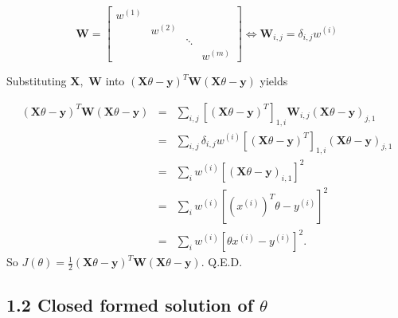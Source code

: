 \documentclass[english,11pt]{article}
\begin{document}
 
\begin{equation}
\boldsymbol{W}=\left[\begin{array}{cccc}
w^{(1)}\\
 & w^{(2)}\\
 &  & \ddots\\
 &  &  & w^{(m)}
\end{array}\right]\Longleftrightarrow\boldsymbol{W}_{i,j}=\delta_{i,j}w^{(i)}    
\end{equation}


Substituting $\boldsymbol{X},$ $\boldsymbol{W}$ into $(\boldsymbol{X}\theta-\boldsymbol{y})^{T}\boldsymbol{W}(\boldsymbol{X}\theta-\boldsymbol{y})$
yields

\begin{eqnarray*}
(\boldsymbol{X}\theta-\boldsymbol{y})^{T}\boldsymbol{W}(\boldsymbol{X}\theta-\boldsymbol{y}) & = & \sum_{i,j}\left[(\boldsymbol{X}\theta-\boldsymbol{y})^{T}\right]_{1,i}\boldsymbol{W}_{i,j}(\boldsymbol{X}\theta-\boldsymbol{y})_{j,1}\\
 & = & \sum_{i,j}\delta_{i,j}w^{(i)}\left[(\boldsymbol{X}\theta-\boldsymbol{y})^{T}\right]_{1,i}(\boldsymbol{X}\theta-\boldsymbol{y})_{j,1}\\
 & = & \sum_{i}w^{(i)}\left[(\boldsymbol{X}\theta-\boldsymbol{y})_{i,1}\right]^{2}\\
 & = & \sum_{i}w^{(i)}\left[\left(x^{(i)}\right)^{T}\theta-y^{(i)}\right]^{2}\\
 & = & \sum_{i}w^{(i)}\left[\theta x^{(i)}-y^{(i)}\right]^{2}.
\end{eqnarray*}
So $J(\theta)=\frac{1}{2}(\boldsymbol{X}\theta-\boldsymbol{y})^{T}\boldsymbol{W}(\boldsymbol{X}\theta-\boldsymbol{y})$.
Q.E.D.

\subsection*{1.2 Closed formed solution of $\theta$}
\end{document}
